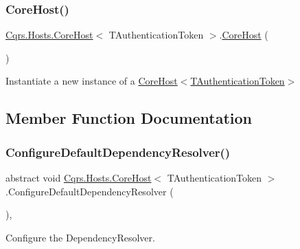 \subsubsection{\texorpdfstring{Core\+Host()}{CoreHost()}}
{\footnotesize\ttfamily \hyperlink{classCqrs_1_1Hosts_1_1CoreHost}{Cqrs.\+Hosts.\+Core\+Host}$<$ T\+Authentication\+Token $>$.\hyperlink{classCqrs_1_1Hosts_1_1CoreHost}{Core\+Host} (\begin{DoxyParamCaption}{ }\end{DoxyParamCaption})\hspace{0.3cm}{\ttfamily [protected]}}



Instantiate a new instance of a \hyperlink{classCqrs_1_1Hosts_1_1CoreHost_aa1f88ad96bd3f1680e18550299cd6f69_aa1f88ad96bd3f1680e18550299cd6f69}{Core\+Host$<$\+T\+Authentication\+Token$>$} 



\subsection{Member Function Documentation}
\mbox{\label{classCqrs_1_1Hosts_1_1CoreHost_a9e6067f83498b6eca0cd7cdc175fd943_a9e6067f83498b6eca0cd7cdc175fd943}} 
\subsubsection{\texorpdfstring{Configure\+Default\+Dependency\+Resolver()}{ConfigureDefaultDependencyResolver()}}
{\footnotesize\ttfamily abstract void \hyperlink{classCqrs_1_1Hosts_1_1CoreHost}{Cqrs.\+Hosts.\+Core\+Host}$<$ T\+Authentication\+Token $>$.Configure\+Default\+Dependency\+Resolver (\begin{DoxyParamCaption}{ }\end{DoxyParamCaption})\hspace{0.3cm}{\ttfamily [protected]}, {}}



Configure the Dependency\+Resolver. 



